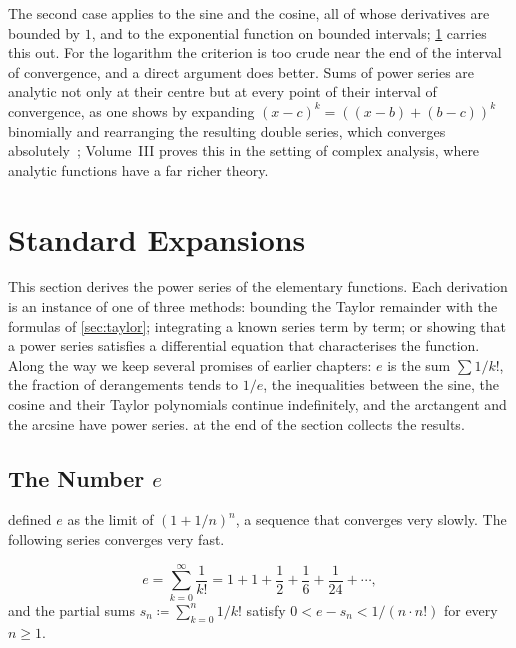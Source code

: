 The second case applies to the sine and the cosine, all of whose derivatives are bounded by $1$, and to the exponential function on bounded intervals; \cref{sec:expansions} carries this out. For the logarithm the criterion is too crude near the end of the interval of convergence, and a direct argument does better. Sums of power series are analytic not only at their centre but at every point of their interval of convergence, as one shows by expanding $(x-c)^k=((x-b)+(b-c))^k$ binomially and rearranging the resulting double series, which converges absolutely~\cite{krantz2002primer}; Volume~III proves this in the setting of complex analysis, where analytic functions have a far richer theory.

\section{Standard Expansions}
\label{sec:expansions}

This section derives the power series of the elementary functions. Each derivation is an instance of one of three methods: bounding the Taylor remainder with the formulas of \cref{sec:taylor}; integrating a known series term by term; or showing that a power series satisfies a differential equation that characterises the function. Along the way we keep several promises of earlier chapters: $e$ is the sum $\sum1/k!$, the fraction of derangements tends to $1/e$, the inequalities between the sine, the cosine and their Taylor polynomials continue indefinitely, and the arctangent and the arcsine have power series.  at the end of the section collects the results.

\subsection{The Number \texorpdfstring{$e$}{e}}

 defined $e$ as the limit of $(1+1/n)^n$, a sequence that converges very slowly. The following series converges very fast.

\begin{theorem}
\label{thm:e-series}
\[
e=\sum_{k=0}^\infty\frac1{k!}=1+1+\frac12+\frac16+\frac1{24}+\cdots ,
\]
and the partial sums $s_n\coloneqq\sum_{k=0}^n1/k!$ satisfy $0<e-s_n<1/(n\cdot n!)$ for every $n\ge1$.
\end{theorem}

